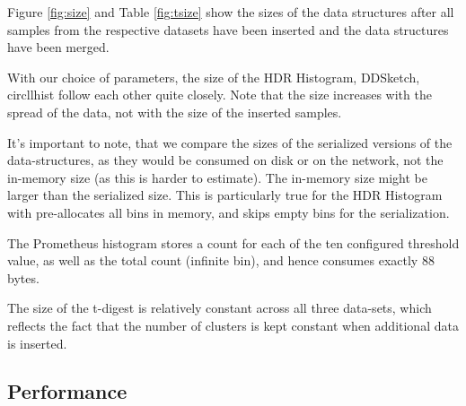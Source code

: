 \documentclass{article}
\theoremstyle{plain}
\theoremstyle{remark}
\begin{document}
Figure \ref{fig:size} and Table \ref{fig:tsize} show the sizes of the data structures after all samples
from the respective datasets have been inserted and the data structures have been merged.

With our choice of parameters, the size of the HDR Histogram, DDSketch, circllhist follow each other
quite closely. Note that the size increases with the spread of the data, not with the size of the
inserted samples.

It's important to note, that we compare the sizes of the serialized versions of the data-structures,
as they would be consumed on disk or on the network, not the in-memory size (as this is harder to
estimate). The in-memory size might be larger than the serialized size. This is particularly true
for the HDR Histogram with pre-allocates all bins in memory, and skips empty bins for the
serialization.

The Prometheus histogram stores a count for each of the ten configured threshold value, as well as
the total count (infinite bin), and hence consumes exactly 88 bytes.

The size of the t-digest is relatively constant across all three data-sets, which reflects the fact
that the number of clusters is kept constant when additional data is inserted.

\subsection{Performance}
\end{document}

